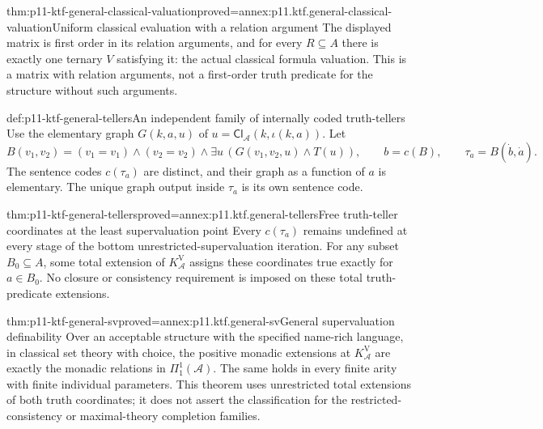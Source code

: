 \begin{hblemma}{thm:p11-ktf-general-classical-valuation}{proved=annex:p11.ktf.general-classical-valuation}{Uniform classical evaluation with a relation argument}
The displayed matrix is first order in its relation arguments, and
for every \(R\subseteq A\) there is exactly one ternary
\(V\) satisfying it: the actual classical formula valuation.
This is a matrix with relation arguments, not a first-order truth
predicate for the structure without such arguments.
\end{hblemma}

\begin{hbdefinition}{def:p11-ktf-general-tellers}{An independent family of internally coded truth-tellers}
Use the elementary graph
\(G(k,a,u)\) of
\(u=\mathsf{Cl}_{\mathcal A}(k,\iota(k,a))\).
Let
\[
 B(v_1,v_2)=(v_1=v_1)\land(v_2=v_2)\land
       \exists u\,(G(v_1,v_2,u)\land T(u)),
 \qquad b=c(B),\qquad \tau_a=B(\dot b,\dot a).
\]
The sentence codes \(c(\tau_a)\) are distinct, and their
graph as a function of \(a\) is elementary. The unique graph
output inside \(\tau_a\) is its own sentence code.
\end{hbdefinition}

\begin{hblemma}{thm:p11-ktf-general-tellers}{proved=annex:p11.ktf.general-tellers}{Free truth-teller coordinates at the least supervaluation point}
Every \(c(\tau_a)\) remains undefined at every stage of the
bottom unrestricted-supervaluation iteration. For any subset
\(B_0\subseteq A\), some total extension of
\(K_{\mathcal A}^{\mathrm V}\) assigns these coordinates
true exactly for \(a\in B_0\). No closure or consistency
requirement is imposed on these total truth-predicate extensions.
\end{hblemma}

\begin{hbtheorem}{thm:p11-ktf-general-sv}{proved=annex:p11.ktf.general-sv}{General supervaluation definability}
Over an acceptable structure with the specified name-rich language,
in classical set theory with choice, the positive monadic extensions
at \(K_{\mathcal A}^{\mathrm V}\) are exactly the monadic
relations in \(\Pi^1_1(\mathcal A)\). The same holds in
every finite arity with finite individual parameters. This theorem
uses unrestricted total extensions of both truth coordinates;
it does not assert the classification for the restricted-consistency
or maximal-theory completion families.
\end{hbtheorem}

